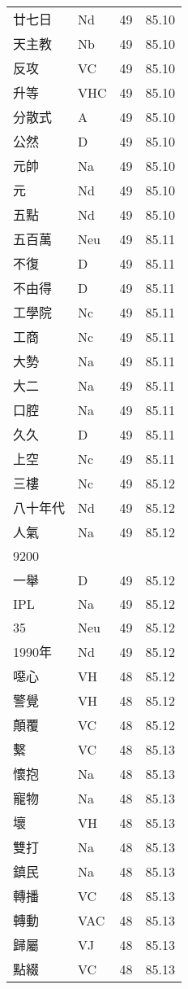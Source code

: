 \documentclass[twocolumn]{book}
\begin{document}
\begin{supertabular}{llrr}
廿七日 & Nd & 49 &  85.10\\
天主教 & Nb & 49 &  85.10\\
反攻 & VC & 49 &  85.10\\
升等 & VHC & 49 &  85.10\\
分散式 & A & 49 &  85.10\\
公然 & D & 49 &  85.10\\
元帥 & Na & 49 &  85.10\\
元 & Nd & 49 &  85.10\\
五點 & Nd & 49 &  85.10\\
五百萬 & Neu & 49 &  85.11\\
不復 & D & 49 &  85.11\\
不由得 & D & 49 &  85.11\\
工學院 & Nc & 49 &  85.11\\
工商 & Nc & 49 &  85.11\\
大勢 & Na & 49 &  85.11\\
大二 & Na & 49 &  85.11\\
口腔 & Na & 49 &  85.11\\
久久 & D & 49 &  85.11\\
上空 & Nc & 49 &  85.11\\
三樓 & Nc & 49 &  85.12\\
八十年代 & Nd & 49 &  85.12\\
人氣 & Na & 49 &  85.12\\
9200\\
一舉 & D & 49 &  85.12\\
IPL & Na & 49 &  85.12\\
35 & Neu & 49 &  85.12\\
1990年 & Nd & 49 &  85.12\\
噁心 & VH & 48 &  85.12\\
警覺 & VH & 48 &  85.12\\
顛覆 & VC & 48 &  85.12\\
繫 & VC & 48 &  85.13\\
懷抱 & Na & 48 &  85.13\\
寵物 & Na & 48 &  85.13\\
壞 & VH & 48 &  85.13\\
雙打 & Na & 48 &  85.13\\
鎮民 & Na & 48 &  85.13\\
轉播 & VC & 48 &  85.13\\
轉動 & VAC & 48 &  85.13\\
歸屬 & VJ & 48 &  85.13\\
點綴 & VC & 48 &  85.13\\

\end{supertabular}
\end{document}

